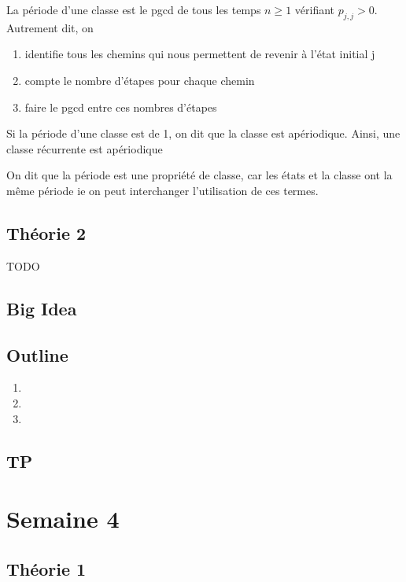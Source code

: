 \documentclass{article}
\begin{document}
\begin{definition}
    La période d'une classe est le pgcd de tous les temps $n \geq 1$
    vérifiant $p_{j,j} >0$. Autrement dit, on
    \begin{enumerate}
        \item identifie tous les chemins qui nous permettent de revenir
	    à l'état initial j
	\item compte le nombre d'étapes pour chaque chemin
	\item faire le pgcd entre ces nombres d'étapes
    \end{enumerate}
\end{definition}

\begin{remark}
    Si la période d'une classe est de 1, on dit que la classe est
    apériodique. Ainsi, une classe récurrente est apériodique
\end{remark}

\begin{remark}
    On dit que la période est une propriété de classe, car les états
    et la classe ont la même période ie on peut interchanger l'utilisation
    de ces termes.
\end{remark}

\subsection{Théorie 2}
TODO
\subsection*{Big Idea}
\subsection*{Outline}
\begin{enumerate}
    \item
    \item
    \item
\end{enumerate}
\subsection{TP}

\pagebreak
\section{Semaine 4}
\subsection{Théorie 1}
\end{document}
